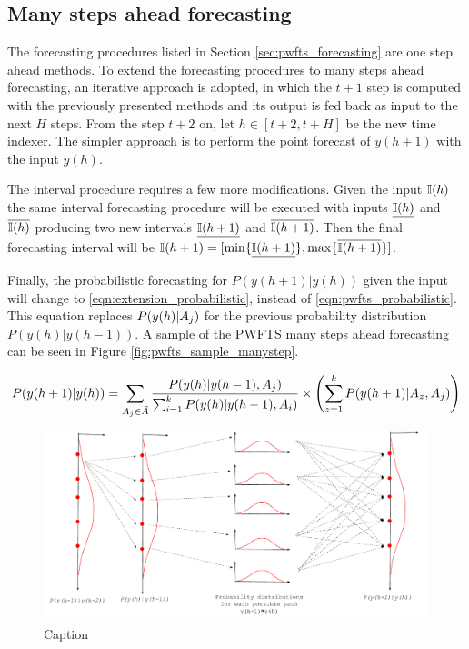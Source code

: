 \subsection{Many steps ahead forecasting}
\label{sec:pwfts_many_step}

The forecasting procedures listed in Section \ref{sec:pwfts_forecasting} are one step ahead methods. To extend the forecasting procedures to many steps ahead forecasting, an iterative approach is adopted, in which the $t+1$ step is computed with the previously presented methods and its output is fed back as input to the next $H$ steps. From the step $t+2$ on, let $h \in [t+2, t+H]$ be the new time indexer. The simpler approach is to perform the point forecast of $y(h+1)$  with the input $y(h)$.

The interval procedure requires a few more modifications. Given the input $\mathbb{I}(h)$ the same interval forecasting procedure will be executed with inputs $\underline{\mathbb{I}(h)}$ and $\overline{\mathbb{I}(h)}$ producing two new intervals $\underline{\mathbb{I}(h+1)}$ and $\overline{\mathbb{I}(h+1)}$. Then the final forecasting interval will be $\mathbb{I}(h+1) = [\min\{\underline{\mathbb{I}(h+1)}\}, \max\{\overline{\mathbb{I}(h+1)}\}]$. 

Finally, the probabilistic forecasting for $P(y(h+1)|y(h))$ given the input will change to  \ref{eqn:extension_probabilistic}, instead of \ref{eqn:pwfts_probabilistic}. This equation replaces $P(y(h) | A_j)$ for the previous probability distribution $P(y(h)|y(h-1))$. A sample of the PWFTS many steps ahead forecasting can be seen in Figure \ref{fig:pwfts_sample_manystep}.


\begin{equation}
P(y(h+1) | y(h))  = \displaystyle \sum_{A_j \in \tilde{A}} \frac{ P(y(h)| y(h-1), A_j)}{ \sum_{i = 1}^k P(y(h)| y(h-1), A_i)} \times  \left(  \sum_{z = 1}^k  P(y(h+1) | A_z,A_j) \right)
\label{eqn:extension_probabilistic}
\end{equation}

\begin{figure}
    \centering
    \includegraphics[width=\textwidth]{figures/pwfts_probabilistic_manysteps.pdf}
    \caption{Caption}
    \label{fig:pwfts_probabilistic_manysteps}
\end{figure}
 
